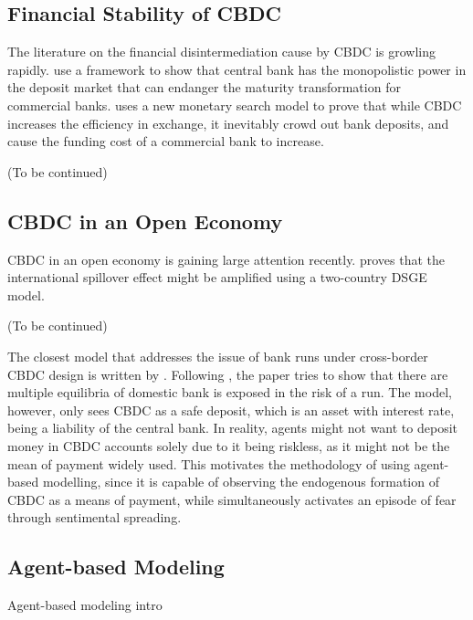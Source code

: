 \subsection{Financial Stability of CBDC}

The literature on the financial disintermediation cause by CBDC is growling rapidly.
\citet*{FVSSU21} use a \citet*{DD83} framework to show that central bank has the
monopolistic power in the deposit market that can endanger the maturity
transformation for commercial banks.
\citet*{Keister19} uses a new monetary search model to prove that while CBDC
increases the efficiency in exchange, it inevitably crowd out bank deposits, and
cause the funding cost of a commercial bank to increase.

\begin{center}
(To be continued)
\end{center}

\subsection{CBDC in an Open Economy}
CBDC in an open economy is gaining large attention recently. \citet*{FMS22}
proves that the international spillover effect might be amplified using a
two-country DSGE model.

\begin{center}
(To be continued)
\end{center}

The closest model that addresses the issue of bank runs under cross-border CBDC
design is written by \citet{Popescu22}. Following \citet*{DD83}, the paper tries
to show that there are multiple equilibria of domestic bank is exposed in the
risk of a run. The model, however, only sees CBDC as a safe deposit, which is an
asset with interest rate, being a liability of the central bank. In reality,
agents might not want to deposit money in CBDC accounts solely due to it being
riskless, as it might not be the mean of payment widely used. This motivates the
methodology of using agent-based modelling, since it is capable of observing the
endogenous formation of CBDC as a means of payment, while simultaneously
activates an episode of fear through sentimental spreading.

\subsection{Agent-based Modeling}

\begin{center}
    Agent-based modeling intro
\end{center}

